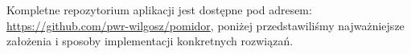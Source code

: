 Kompletne repozytorium aplikacji jest dostępne pod adresem: \url{https://github.com/pwr-wilgosz/pomidor}, poniżej przedstawiliśmy najważniejsze założenia i sposoby implementacji konkretnych rozwiązań.
